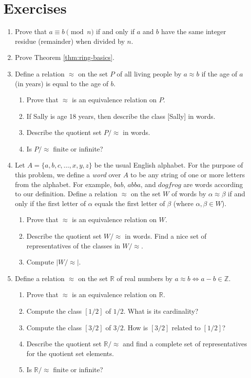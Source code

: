 \documentclass[11pt]{article}
\newenvironment{problems}
{
 \begin{enumerate}[topsep=1pt,itemsep=0pt,parsep=2pt,leftmargin=0.6cm,%
 label={\arabic*.}, ref=\arabic*] \small
}
{
 \end{enumerate}
}
\theoremstyle{definition}
\newcommand{\R}{\mathbb{R}} %
\newcommand{\Z}{\mathbb{Z}} %
\renewcommand{\iff}{\Leftrightarrow}
\begin{document}
\section*{Exercises}
\begin{problems}

\item Prove that $a \equiv b \pmod{n}$ if and only if $a$ and $b$ have
  the same integer residue (remainder) when divided by $n$.

\item Prove Theorem \ref{thm:ring-basics}. 

\item Define a relation $\approx$ on the set $P$ of all living people
  by $a \approx b$ if the age of $a$ (in years) is equal to the age of
  $b$. 
  \begin{enumerate}
  \item Prove that $\approx$ is an equivalence relation on $P$.
  \item If Sally is age 18 years, then describe the class [Sally] in words.
  \item Describe the quotient set $P/\!\!\approx$ in words.
  \item Is $P/\!\!\approx$ finite or infinite?
  \end{enumerate}

\item Let $A = \{a, b, c, \dots, x, y, z \}$ be the usual English
  alphabet. For the purpose of this problem, we define a \emph{word}
  over $A$ to be any string of one or more letters from the
  alphabet. For example, $bab$, $abba$, and $dogfrog$ are words
  according to our definition. Define a relation $\approx$ on the set
  $W$ of words by $\alpha \approx \beta$ if and only if the first
  letter of $\alpha$ equals the first letter of $\beta$ (where
  $\alpha, \beta \in W$).
  \begin{enumerate}
  \item Prove that $\approx$ is an equivalence relation on $W$.
  \item Describe the quotient set $W/\!\!\approx$ in words. Find a
    nice set of representatives of the classes in $W/\!\!\approx$.
  \item Compute $|W/\!\!\approx|$. 
  \end{enumerate}




\item Define a relation $\approx$ on the set $\R$ of real numbers by
  $a \approx b \iff a - b \in \Z$. 
  \begin{enumerate}
  \item Prove that $\approx$ is an equivalence relation on $\R$.
  \item Compute the class $[1/2]$ of $1/2$. What is its cardinality?
  \item Compute the class $[3/2]$ of $3/2$. How is $[3/2]$ related to
    $[1/2]$?
  \item Describe the quotient set $\R/\!\!\approx$ and find a complete
    set of representatives for the quotient set elements.
  \item Is $\R/\!\!\approx$ finite or infinite?
  \end{enumerate}


\end{problems}
\end{document}
